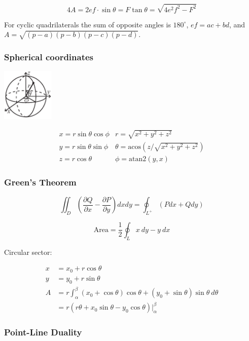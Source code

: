 \[ 4A = 2ef \cdot \sin\theta = F\tan\theta = \sqrt{4e^2f^2-F^2} \]

 For cyclic quadrilaterals the sum of opposite angles is $180^\circ$,
$ef = ac + bd$, and $A = \sqrt{(p-a)(p-b)(p-c)(p-d)}$.

\subsubsection{Spherical coordinates}
\begin{center}
\includegraphics[width=25mm]{sphericalCoordinates.pdf}
\end{center}
\[\begin{array}{cc}
x = r\sin\theta\cos\phi & r = \sqrt{x^2+y^2+z^2}\\
y = r\sin\theta\sin\phi & \theta = \textrm{acos}(z/\sqrt{x^2+y^2+z^2})\\
z = r\cos\theta & \phi = \textrm{atan2}(y,x)
\end{array}\]

\subsubsection{Green's Theorem}

\[ \iint_D \left( \frac{\partial Q}{\partial x} - \frac{\partial P}{\partial y} \right) dxdy
= \oint_{L^+} (Pdx + Qdy)\]

\[ \text{Area} = \frac{1}{2} \oint_L x\ dy - y\ dx \]

Circular sector:

\begin{align*}
    x &= x_0 + r\cos\theta \\
    y &= y_0 + r\sin\theta \\
    A &= r \int_\alpha^\beta (x_0 + \cos\theta)\cos\theta + (y_0 + \sin\theta)\sin\theta\ d\theta \\
      &= r (r \theta + x_0 \sin\theta - y_0 \cos\theta) \rvert_\alpha^\beta
\end{align*}

\subsubsection{Point-Line Duality}

